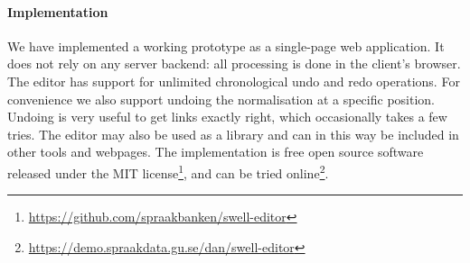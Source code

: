 \documentclass[10pt, a4paper]{article}
\begin{document}




\paragraph{Implementation}
We have implemented a working prototype as a single-page web application.
It does not rely on any server backend: all processing is done in the
client's browser.
The editor has support for unlimited chronological undo and redo operations.
For convenience we also support undoing the normalisation at a specific position.
Undoing is very useful to get links exactly right, which occasionally takes a
few tries.
The editor may also be used as a library and can in this way
be included in other tools and webpages.
The implementation is free open source software released under the
MIT license\footnote{\url{https://github.com/spraakbanken/swell-editor}},
and can be tried online\footnote{\url{https://demo.spraakdata.gu.se/dan/swell-editor}}.
\end{document}
